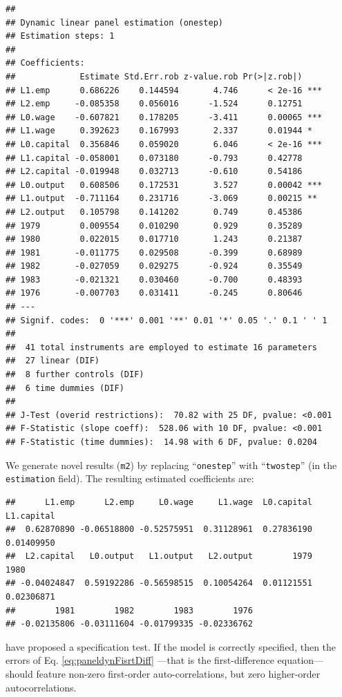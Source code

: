 \documentclass[
  12pt,
]{book}
\theoremstyle{definition}
\theoremstyle{definition}
\theoremstyle{definition}
\theoremstyle{definition}
\theoremstyle{remark}
\begin{document}
\begin{verbatim}
## 
## Dynamic linear panel estimation (onestep)
## Estimation steps: 1
## 
## Coefficients:
##             Estimate Std.Err.rob z-value.rob Pr(>|z.rob|)    
## L1.emp      0.686226    0.144594       4.746      < 2e-16 ***
## L2.emp     -0.085358    0.056016      -1.524      0.12751    
## L0.wage    -0.607821    0.178205      -3.411      0.00065 ***
## L1.wage     0.392623    0.167993       2.337      0.01944 *  
## L0.capital  0.356846    0.059020       6.046      < 2e-16 ***
## L1.capital -0.058001    0.073180      -0.793      0.42778    
## L2.capital -0.019948    0.032713      -0.610      0.54186    
## L0.output   0.608506    0.172531       3.527      0.00042 ***
## L1.output  -0.711164    0.231716      -3.069      0.00215 ** 
## L2.output   0.105798    0.141202       0.749      0.45386    
## 1979        0.009554    0.010290       0.929      0.35289    
## 1980        0.022015    0.017710       1.243      0.21387    
## 1981       -0.011775    0.029508      -0.399      0.68989    
## 1982       -0.027059    0.029275      -0.924      0.35549    
## 1983       -0.021321    0.030460      -0.700      0.48393    
## 1976       -0.007703    0.031411      -0.245      0.80646    
## ---
## Signif. codes:  0 '***' 0.001 '**' 0.01 '*' 0.05 '.' 0.1 ' ' 1
## 
##  41 total instruments are employed to estimate 16 parameters
##  27 linear (DIF) 
##  8 further controls (DIF) 
##  6 time dummies (DIF) 
##  
## J-Test (overid restrictions):  70.82 with 25 DF, pvalue: <0.001
## F-Statistic (slope coeff):  528.06 with 10 DF, pvalue: <0.001
## F-Statistic (time dummies):  14.98 with 6 DF, pvalue: 0.0204
\end{verbatim}

We generate novel results (\texttt{m2}) by replacing ``\texttt{onestep}'' with ``\texttt{twostep}'' (in the \texttt{estimation} field). The resulting estimated coefficients are:

\begin{verbatim}
##      L1.emp      L2.emp     L0.wage     L1.wage  L0.capital  L1.capital 
##  0.62870890 -0.06518800 -0.52575951  0.31128961  0.27836190  0.01409950 
##  L2.capital   L0.output   L1.output   L2.output        1979        1980 
## -0.04024847  0.59192286 -0.56598515  0.10054264  0.01121551  0.02306871 
##        1981        1982        1983        1976 
## -0.02135806 -0.03111604 -0.01799335 -0.02336762
\end{verbatim}

\citet{Arellano_Bond_1991} have proposed a specification test. If the model is correctly specified, then the errors of Eq. \eqref{eq:paneldynFisrtDiff} ---that is the first-difference equation--- should feature non-zero first-order auto-correlations, but zero higher-order autocorrelations.
\end{document}
